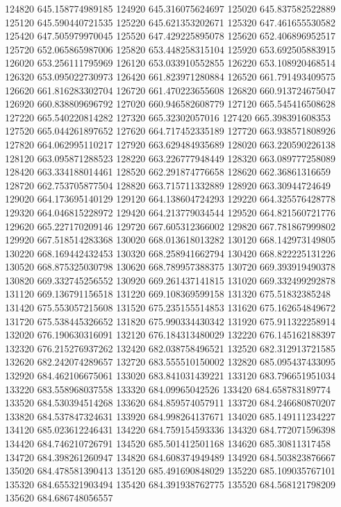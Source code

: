 {124820 645.158774989185
124920 645.316075624697
125020 645.837582522889
125120 645.590440721535
125220 645.621353202671
125320 647.461655530582
125420 647.505979970045
125520 647.429225895078
125620 652.406896952517
125720 652.065865987006
125820 653.448258315104
125920 653.692505883915
126020 653.256111795969
126120 653.033910552855
126220 653.108920468514
126320 653.095022730973
126420 661.823971280884
126520 661.791493409575
126620 661.816283302704
126720 661.470223655608
126820 660.913724675047
126920 660.838809696792
127020 660.946582608779
127120 665.545416508628
127220 665.540220814282
127320 665.32302057016
127420 665.398391608353
127520 665.044261897652
127620 664.717452335189
127720 663.938571808926
127820 664.062995110217
127920 663.629484935689
128020 663.220590226138
128120 663.095871288523
128220 663.226777948449
128320 663.089777258089
128420 663.334188014461
128520 662.291874776658
128620 662.36861316659
128720 662.753705877504
128820 663.715711332889
128920 663.30944724649
129020 664.173695140129
129120 664.138604724293
129220 664.325576428778
129320 664.046815228972
129420 664.213779034544
129520 664.821560721776
129620 665.227170209146
129720 667.605312366002
129820 667.781867999802
129920 667.518514283368
130020 668.013618013282
130120 668.142973149805
130220 668.169442432453
130320 668.258941662794
130420 668.822225131226
130520 668.875325030798
130620 668.789957388375
130720 669.393919490378
130820 669.332745256552
130920 669.261437141815
131020 669.332499292878
131120 669.136791156518
131220 669.108369599158
131320 675.51832385248
131420 675.553057215608
131520 675.235155514853
131620 675.162654849672
131720 675.538445326652
131820 675.990334430342
131920 675.911322258914
132020 676.190630316091
132120 676.184313480029
132220 676.145162188397
132320 676.215276937262
132420 682.038758496521
132520 682.312913721585
132620 682.242074289657
132720 683.555510150002
132820 685.095437433095
132920 684.462106675061
133020 683.841031439221
133120 683.796651951034
133220 683.558968037558
133320 684.09965042526
133420 684.658783189774
133520 684.530394514268
133620 684.859574057911
133720 684.246680870207
133820 684.537847324631
133920 684.998264137671
134020 685.149111234227
134120 685.023612246431
134220 684.759154593336
134320 684.772071596398
134420 684.746210726791
134520 685.501412501168
134620 685.30811317458
134720 684.398261260947
134820 684.608374949489
134920 684.503823876667
135020 684.478581390413
135120 685.491690848029
135220 685.109035767101
135320 684.655321903494
135420 684.391938762775
135520 684.568121798209
135620 684.686748056557
}
